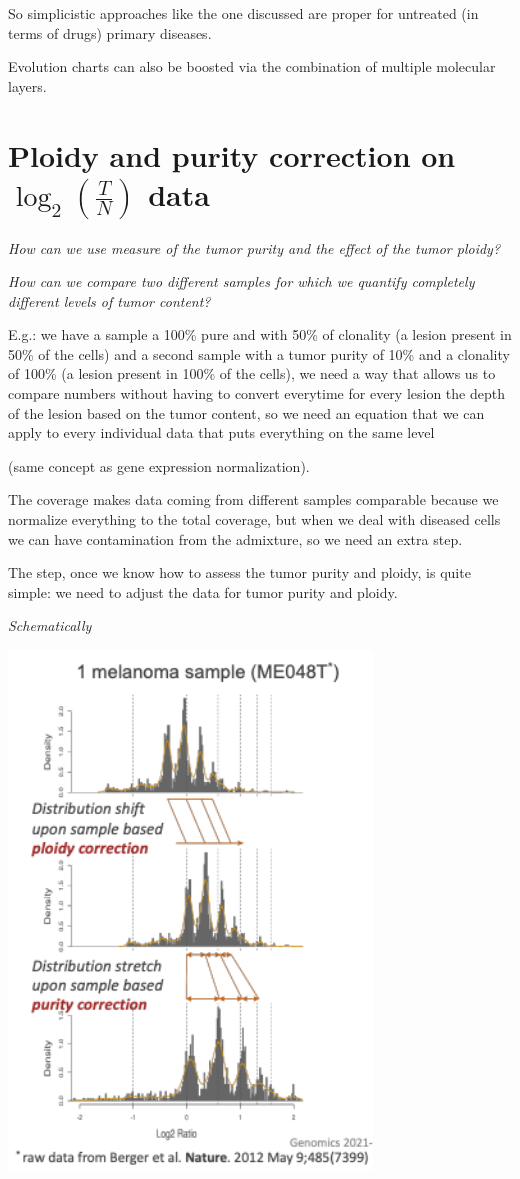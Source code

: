So simplicistic approaches like the one discussed are proper for untreated (in
terms of drugs) primary diseases.

Evolution charts can also be boosted via the combination of multiple molecular
layers.

\section{Ploidy and purity correction on $\log_2(\frac{T}{N})$ data}

\emph{How can we use measure of the tumor purity and the effect of the tumor
ploidy?}

\emph{How can we compare two different samples for which we quantify completely
different levels of tumor content?}

E.g.: we have a sample a 100\% pure and with 50\% of clonality (a lesion present
in 50\% of the cells) and a second sample with a tumor purity of 10\% and a
clonality of 100\% (a lesion present in 100\% of the cells), we need a way that
allows us to compare numbers without having to convert everytime for every
lesion the depth of the lesion based on the tumor content, so we need an
equation that we can apply to every individual data that puts everything on the
same level

(same concept as gene expression normalization).

The coverage makes data coming from different samples comparable because we
normalize everything to the total coverage, but when we deal with diseased cells
we can have contamination from the admixture, so we need an extra step.

The step, once we know how to assess the tumor purity and ploidy, is quite
simple: we need to adjust the data for tumor purity and ploidy.

\emph{Schematically}

\includegraphics[width=3.79931in,height=5.42569in]{image7.png}\\

